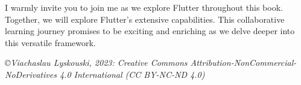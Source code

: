 \noindent I warmly invite you to join me as we explore Flutter throughout this book. Together, we will explore Flutter's 
extensive capabilities. This collaborative learning journey promises to be exciting and enriching as we delve deeper 
into this versatile framework.


\vspace{1cm}


\noindent \emph{\small \copyright Viachaslau Lyskouski, 2023: Creative Commons Attribution-NonCommercial-NoDerivatives 
4.0 International (CC BY-NC-ND 4.0)}

\newpage
\thispagestyle{empty}
~